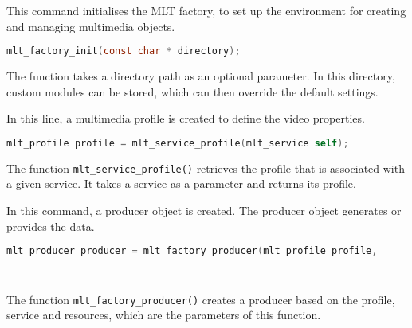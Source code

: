 \documentclass[../MasterThesis.tex]{subfiles}
\begin{document}
\begin{description}[font=\color{RedViolet!80!black}, style=nextline]
	
	\item[Initialise the factory] 
	
	This command initialises the MLT factory, to set up the environment for creating and managing multimedia objects.
	
	\begin{lstlisting}[language=C, numbers=none, columns=fullflexible, belowskip=0pt, aboveskip=9pt]
	mlt_factory_init(const char * directory); \end{lstlisting}

	The function takes a directory path as an optional parameter. In this directory, custom modules can be stored, which can then override the default settings. %
	
	
	\item[Create a profile]
	
	In this line, a multimedia profile is created to define the video properties.
	
	\begin{lstlisting}[language=C, numbers=none, columns=fullflexible, belowskip=0pt, aboveskip=9pt]
	mlt_profile profile = mlt_service_profile(mlt_service self); \end{lstlisting}
	
	The function \texttt{mlt\_service\_profile()} retrieves the profile that is associated with a given service. It takes a service as a parameter and returns its profile.
	
	


	\item[Create a producer] 

	In this command, a producer object is created. The producer object generates or provides the data.

	\begin{lstlisting}[language=C, numbers=none, columns=fullflexible, belowskip=0pt, aboveskip=9pt]
	mlt_producer producer = mlt_factory_producer(mlt_profile profile,
																							const char* service,
																							const void* resource); \end{lstlisting}
																						 
	The function \texttt{mlt\_factory\_producer()} creates a producer based on the profile, service and resources, which are the parameters of this function.



\end{description}
\end{document}
